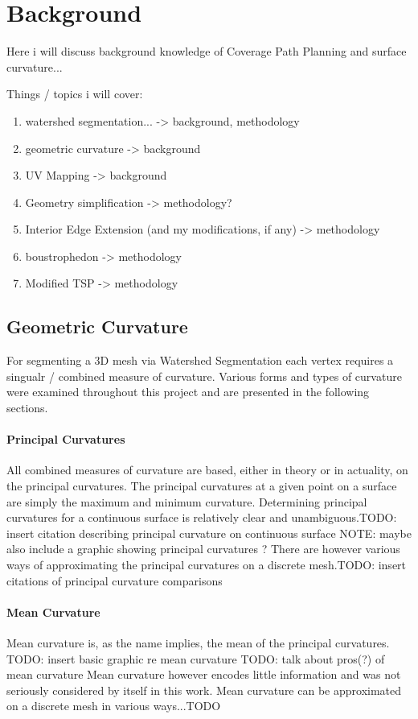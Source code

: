 \chapter{Background}
Here i will discuss background knowledge of Coverage Path Planning and surface curvature...

Things / topics i will cover:
\begin{enumerate}
	\item watershed segmentation... -> background, methodology
	\item geometric curvature -> background
	\item UV Mapping -> background
	\item Geometry simplification -> methodology?
	\item Interior Edge Extension (and my modifications, if any) -> methodology
	\item boustrophedon -> methodology
	\item Modified TSP -> methodology
\end{enumerate}


\section{Geometric Curvature}
For segmenting a 3D mesh via Watershed Segmentation each vertex requires a singualr / combined measure of curvature.
Various forms and types of curvature were examined throughout this project and are presented in the following sections.

\subsubsection{Principal Curvatures}
All combined measures of curvature are based, either in theory or in actuality, on the principal curvatures.
The principal curvatures at a given point on a surface are simply the maximum and minimum curvature.
Determining principal curvatures for a continuous surface is relatively clear and unambiguous.TODO: insert citation describing principal curvature on continuous surface
NOTE: maybe also include a graphic showing principal curvatures ?
There are however various ways of approximating the principal curvatures on a discrete mesh.TODO: insert citations of principal curvature comparisons

\subsubsection{Mean Curvature}
Mean curvature is, as the name implies, the mean of the principal curvatures.
TODO: insert basic graphic re mean curvature
TODO: talk about pros(?) of mean curvature
Mean curvature however encodes little information and was not seriously considered by itself in this work.
Mean curvature can be approximated on a discrete mesh in various ways...TODO

